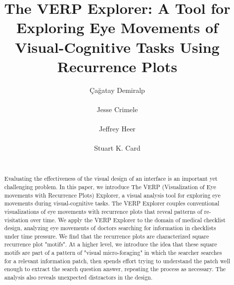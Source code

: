 \documentclass{sigchi}
\DeclareRobustCommand{\cagatay}{\c{C}a\u{g}atay Demiralp\xspace}
\DeclareRobustCommand{\jeff}{Jeffrey Heer\xspace}
\begin{document}
\title{The VERP Explorer: A Tool for Exploring Eye Movements of
Visual-Cognitive Tasks Using Recurrence Plots}

 \author{ 
	\alignauthor \cagatay \\
	\\
	\alignauthor Jesse Crimele\\
	 \\
	\alignauthor \jeff \\
	\\ 
	\alignauthor Stuart K. Card \\ 
	 \\
}

\maketitle

\begin{abstract} 
Evaluating the effectiveness of the visual design of an
interface is an important yet challenging problem. In this paper, we
introduce The VERP (Visualization of Eye movements with Recurrence Plots)
Explorer, a visual analysis tool for exploring eye movements during
visual-cognitive tasks. The VERP Explorer couples conventional
visualizations of eye movements with recurrence plots that reveal patterns
of re-visitation over time. We apply the VERP Explorer to the domain
of medical checklist design, analyzing eye movements of doctors searching
for information in checklists under time pressure. We find that the recurrence
plots are characterized square recurrence plot "motifs". At a higher level, we introduce the idea that these square motifs are part of a pattern of "visual micro-foraging" in which the searcher searches for a relevant information patch, then spends effort trying to understand the patch well enough to extract the search question answer, repeating the process as necessary. The analysis also reveals unexpected distractors in the design.
\end{abstract}

\end{document}

